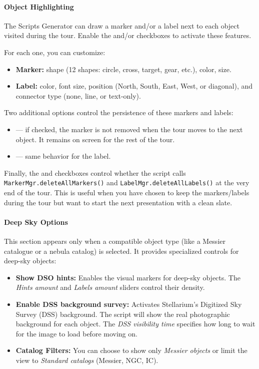 \paragraph{Object Highlighting}
The Scripts Generator can draw a marker and/or a label next to each object visited during the tour. Enable the  and/or  checkboxes to activate these features.

For each one, you can customize:
\begin{itemize}
    \item \textbf{Marker:} shape (12 shapes: circle, cross, target, gear, etc.), color, size.
    \item \textbf{Label:} color, font size, position (North, South, East, West, or diagonal), and connector type (none, line, or text-only).
\end{itemize}

Two additional options control the persistence of these markers and labels:
\begin{itemize}
    \item {} — if checked, the marker is not removed when the tour moves to the next object. It remains on screen for the rest of the tour.
    \item {} — same behavior for the label.
\end{itemize}

Finally, the  and  checkboxes control whether the script calls \texttt{MarkerMgr.deleteAllMarkers()} and \texttt{LabelMgr.deleteAllLabels()} at the very end of the tour. This is useful when you have chosen to keep the markers/labels during the tour but want to start the next presentation with a clean slate.

\paragraph{Deep Sky Options}
This section appears only when a compatible object type (like a Messier catalogue or a nebula catalog) is selected. It provides specialized controls for deep-sky objects:
\begin{itemize}
\item \textbf{Show DSO hints:} Enables the visual markers for deep-sky objects. The \emph{Hints amount} and \emph{Labels amount} sliders control their density.
\item \textbf{Enable DSS background survey:} Activates Stellarium's Digitized Sky Survey (DSS) background. The script will show the real photographic background for each object. The \emph{DSS visibility time} specifies how long to wait for the image to load before moving on.
\item \textbf{Catalog Filters:} You can choose to show only \emph{Messier objects} or limit the view to \emph{Standard catalogs} (Messier, NGC, IC).
\end{itemize}

